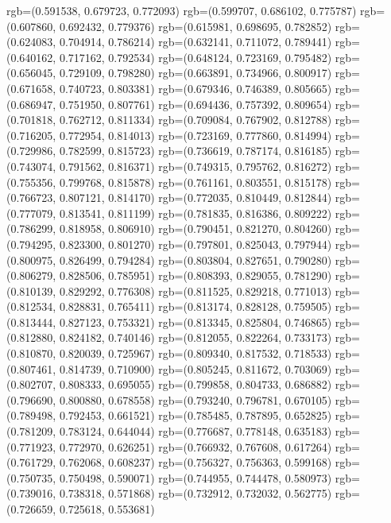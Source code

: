 {{{					rgb=(0.591538, 0.679723, 0.772093)
					rgb=(0.599707, 0.686102, 0.775787)
					rgb=(0.607860, 0.692432, 0.779376)
					rgb=(0.615981, 0.698695, 0.782852)
					rgb=(0.624083, 0.704914, 0.786214)
					rgb=(0.632141, 0.711072, 0.789441)
					rgb=(0.640162, 0.717162, 0.792534)
					rgb=(0.648124, 0.723169, 0.795482)
					rgb=(0.656045, 0.729109, 0.798280)
					rgb=(0.663891, 0.734966, 0.800917)
					rgb=(0.671658, 0.740723, 0.803381)
					rgb=(0.679346, 0.746389, 0.805665)
					rgb=(0.686947, 0.751950, 0.807761)
					rgb=(0.694436, 0.757392, 0.809654)
					rgb=(0.701818, 0.762712, 0.811334)
					rgb=(0.709084, 0.767902, 0.812788)
					rgb=(0.716205, 0.772954, 0.814013)
					rgb=(0.723169, 0.777860, 0.814994)
					rgb=(0.729986, 0.782599, 0.815723)
					rgb=(0.736619, 0.787174, 0.816185)
					rgb=(0.743074, 0.791562, 0.816371)
					rgb=(0.749315, 0.795762, 0.816272)
					rgb=(0.755356, 0.799768, 0.815878)
					rgb=(0.761161, 0.803551, 0.815178)
					rgb=(0.766723, 0.807121, 0.814170)
					rgb=(0.772035, 0.810449, 0.812844)
					rgb=(0.777079, 0.813541, 0.811199)
					rgb=(0.781835, 0.816386, 0.809222)
					rgb=(0.786299, 0.818958, 0.806910)
					rgb=(0.790451, 0.821270, 0.804260)
					rgb=(0.794295, 0.823300, 0.801270)
					rgb=(0.797801, 0.825043, 0.797944)
					rgb=(0.800975, 0.826499, 0.794284)
					rgb=(0.803804, 0.827651, 0.790280)
					rgb=(0.806279, 0.828506, 0.785951)
					rgb=(0.808393, 0.829055, 0.781290)
					rgb=(0.810139, 0.829292, 0.776308)
					rgb=(0.811525, 0.829218, 0.771013)
					rgb=(0.812534, 0.828831, 0.765411)
					rgb=(0.813174, 0.828128, 0.759505)
					rgb=(0.813444, 0.827123, 0.753321)
					rgb=(0.813345, 0.825804, 0.746865)
					rgb=(0.812880, 0.824182, 0.740146)
					rgb=(0.812055, 0.822264, 0.733173)
					rgb=(0.810870, 0.820039, 0.725967)
					rgb=(0.809340, 0.817532, 0.718533)
					rgb=(0.807461, 0.814739, 0.710900)
					rgb=(0.805245, 0.811672, 0.703069)
					rgb=(0.802707, 0.808333, 0.695055)
					rgb=(0.799858, 0.804733, 0.686882)
					rgb=(0.796690, 0.800880, 0.678558)
					rgb=(0.793240, 0.796781, 0.670105)
					rgb=(0.789498, 0.792453, 0.661521)
					rgb=(0.785485, 0.787895, 0.652825)
					rgb=(0.781209, 0.783124, 0.644044)
					rgb=(0.776687, 0.778148, 0.635183)
					rgb=(0.771923, 0.772970, 0.626251)
					rgb=(0.766932, 0.767608, 0.617264)
					rgb=(0.761729, 0.762068, 0.608237)
					rgb=(0.756327, 0.756363, 0.599168)
					rgb=(0.750735, 0.750498, 0.590071)
					rgb=(0.744955, 0.744478, 0.580973)
					rgb=(0.739016, 0.738318, 0.571868)
					rgb=(0.732912, 0.732032, 0.562775)
					rgb=(0.726659, 0.725618, 0.553681)
}}}
